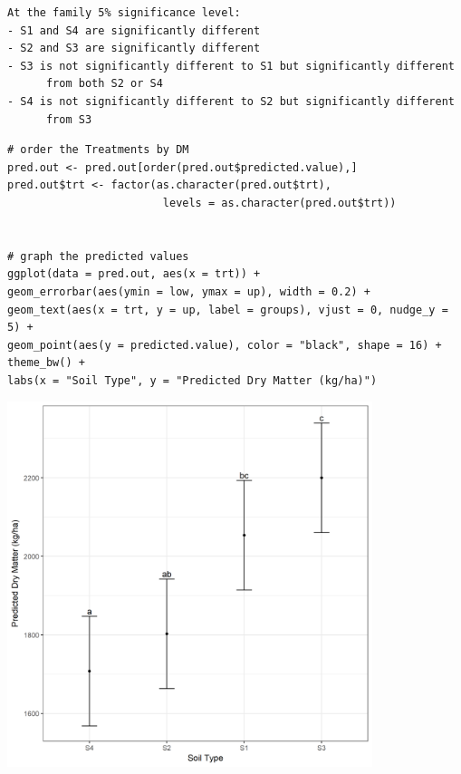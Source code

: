 \documentclass[a4paper, 10pt, fleqn, twosided]{memoir}
\begin{document}
\begin{tcolorbox}[title = Example 4 Prediction interpretation]
\begin{verbatim}
At the family 5% significance level:
- S1 and S4 are significantly different
- S2 and S3 are significantly different
- S3 is not significantly different to S1 but significantly different
      from both S2 or S4
- S4 is not significantly different to S2 but significantly different
      from S3
\end{verbatim}
\end{tcolorbox}


\begin{tcolorbox}[title = Example 4 Graph of predicted values]
\begin{verbatim}
# order the Treatments by DM
pred.out <- pred.out[order(pred.out$predicted.value),]
pred.out$trt <- factor(as.character(pred.out$trt),
                        levels = as.character(pred.out$trt))


# graph the predicted values 
ggplot(data = pred.out, aes(x = trt)) +
geom_errorbar(aes(ymin = low, ymax = up), width = 0.2) +
geom_text(aes(x = trt, y = up, label = groups), vjust = 0, nudge_y = 5) +
geom_point(aes(y = predicted.value), color = "black", shape = 16) + theme_bw() +
labs(x = "Soil Type", y = "Predicted Dry Matter (kg/ha)")

\end{verbatim}
\end{tcolorbox}


\begin{tcolorbox}[title = Example 4 Graph of predicted values]
\includegraphics[width=0.8\textwidth, frame]{Example4LMMPred.png}
\end{tcolorbox}
\end{document}
